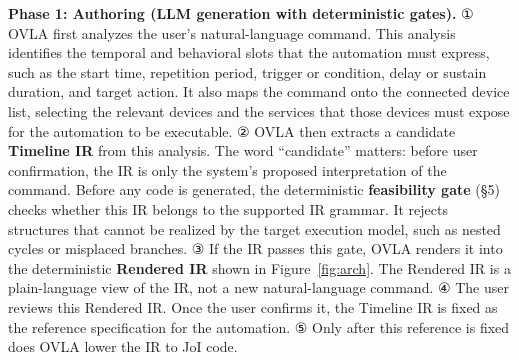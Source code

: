 \documentclass[sigconf,nonacm,anonymous,review]{acmart}
\begin{document}
\textbf{Phase 1: Authoring (LLM generation with deterministic gates).} ① OVLA first analyzes the user's natural-language command. This analysis identifies the temporal and behavioral slots that the automation must express, such as the start time, repetition period, trigger or condition, delay or sustain duration, and target action. It also maps the command onto the connected device list, selecting the relevant devices and the services that those devices must expose for the automation to be executable. ② OVLA then extracts a candidate \textbf{Timeline IR} from this analysis. The word ``candidate'' matters: before user confirmation, the IR is only the system's proposed interpretation of the command. Before any code is generated, the deterministic \textbf{feasibility gate} (\S5) checks whether this IR belongs to the supported IR grammar. It rejects structures that cannot be realized by the target execution model, such as nested cycles or misplaced branches. ③ If the IR passes this gate, OVLA renders it into the deterministic \textbf{Rendered IR} shown in Figure~\ref{fig:arch}. The Rendered IR is a plain-language view of the IR, not a new natural-language command. ④ The user reviews this Rendered IR. Once the user confirms it, the Timeline IR is fixed as the reference specification for the automation. ⑤ Only after this reference is fixed does OVLA lower the IR to JoI code.
\end{document}
